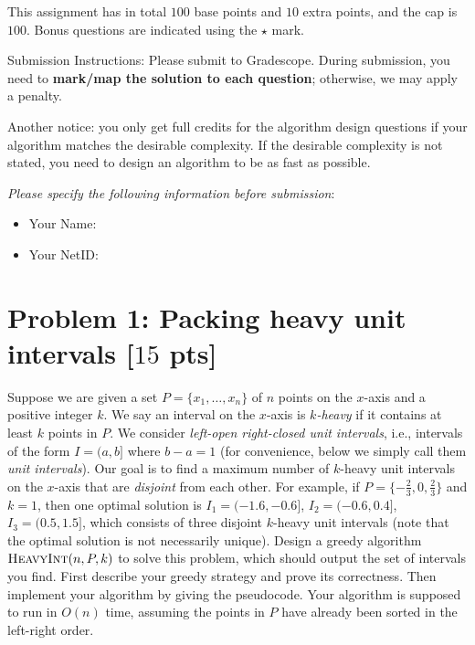 \documentclass[letterpaper, 11pt]{article}
\newcommand{\1}{\mathds{1}}	%
\theoremstyle{definition}
\newcommand{\problem}[1]{\section*{Problem #1}}
\begin{document}
This assignment has in total $100$ base points and $10$ extra points, and the cap is $100$.
Bonus questions are indicated using the $\star$ mark.

Submission Instructions: Please submit to Gradescope. During submission, you need to \textbf{mark/map the solution to each question}; otherwise, we may apply a penalty. 

Another notice: you only get full credits for the algorithm design questions if your algorithm matches the desirable complexity. If the desirable complexity is not stated, you need to design an algorithm to be as fast as possible.

\textit{Please specify the following information before submission}:
\begin{itemize}
    \item Your Name: %
    \item Your NetID: %
\end{itemize}
\newpage

\problem{1: Packing heavy unit intervals [$15$ pts]}

Suppose we are given a set $P = \{x_1,\dots,x_n\}$ of $n$ points on the $x$-axis and a positive integer $k$.
We say an interval on the $x$-axis is \textit{$k$-heavy} if it contains at least $k$ points in $P$.
We consider \textit{left-open right-closed unit intervals}, i.e., intervals of the form $I = (a,b]$ where $b-a = 1$ (for convenience, below we simply call them \textit{unit intervals}).
Our goal is to find a maximum number of $k$-heavy unit intervals on the $x$-axis that are \textit{disjoint} from each other.
For example, if $P = \{-\frac{2}{3},0,\frac{2}{3}\}$ and $k = 1$, then one optimal solution is $I_1 = (-1.6,-0.6]$, $I_2 = (-0.6,0.4]$, $I_3 = (0.5,1.5]$, which consists of three disjoint $k$-heavy unit intervals (note that the optimal solution is not necessarily unique).
Design a greedy algorithm $\textsc{HeavyInt}(n,P,k)$ to solve this problem, which should output the set of intervals you find.
First describe your greedy strategy and prove its correctness.
Then implement your algorithm by giving the pseudocode.
Your algorithm is supposed to run in $O(n)$ time, assuming the points in $P$ have already been sorted in the left-right order.
\end{document}
